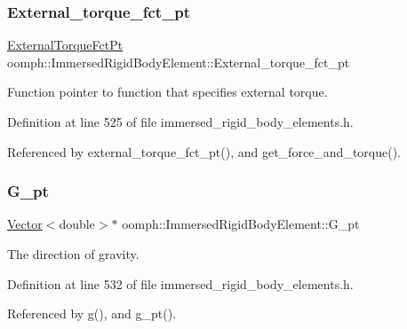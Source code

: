 \subsubsection{\texorpdfstring{External\+\_\+torque\+\_\+fct\+\_\+pt}{External\_torque\_fct\_pt}}
{\footnotesize\ttfamily \hyperlink{classoomph_1_1ImmersedRigidBodyElement_a455638a1d0e9547290d835513d00c40e}{External\+Torque\+Fct\+Pt} oomph\+::\+Immersed\+Rigid\+Body\+Element\+::\+External\+\_\+torque\+\_\+fct\+\_\+pt\hspace{0.3cm}{\ttfamily [private]}}



Function pointer to function that specifies external torque. 



Definition at line 525 of file immersed\+\_\+rigid\+\_\+body\+\_\+elements.\+h.



Referenced by external\+\_\+torque\+\_\+fct\+\_\+pt(), and get\+\_\+force\+\_\+and\+\_\+torque().

\mbox{\label{classoomph_1_1ImmersedRigidBodyElement_ad8c6a50f2055f33942e011661a8b4499}} 
\subsubsection{\texorpdfstring{G\+\_\+pt}{G\_pt}}
{\footnotesize\ttfamily \hyperlink{classoomph_1_1Vector}{Vector}$<$double$>$$\ast$ oomph\+::\+Immersed\+Rigid\+Body\+Element\+::\+G\+\_\+pt\hspace{0.3cm}{\ttfamily [private]}}



The direction of gravity. 



Definition at line 532 of file immersed\+\_\+rigid\+\_\+body\+\_\+elements.\+h.



Referenced by g(), and g\+\_\+pt().

\mbox{\label{classoomph_1_1ImmersedRigidBodyElement_aa522d91f432b5da330042ee34735fab2}} 
